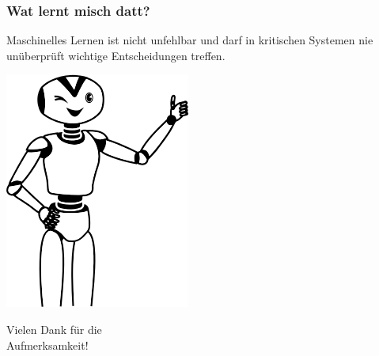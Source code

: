 \documentclass[aspectratio=169,x11names]{beamer}
\begin{document}
\begin{frame}
\frametitle{Wat lernt misch datt?}
\begin{center}
\color{red}
\large
Maschinelles Lernen ist nicht unfehlbar und darf in kritischen Systemen nie 
unüberprüft wichtige Entscheidungen treffen.
\end{center}
\end{frame}

\begin{frame}[fragile]

\begin{multicols}{2}

\vspace*{60pt}
\includegraphics[scale=0.6]{images/Happy-Thumbs-Up-Robot.png} 

\columnbreak

\vspace*{60pt}

\Huge
\hspace*{-30pt}Vielen Dank für die\\ \hspace*{-20pt} Aufmerksamkeit!
\end{multicols}
\end{frame}
\end{document}
